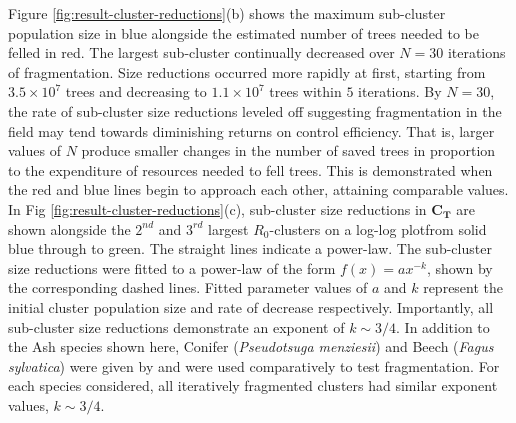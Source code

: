 Figure \ref{fig:result-cluster-reductions}(b) shows the maximum sub-cluster population size in blue alongside the estimated number of trees needed to be felled in red. The largest sub-cluster continually decreased over $N=30$ iterations of fragmentation. Size reductions occurred more rapidly at first, starting from $\mathrm{3.5\times 10^7}$ trees and decreasing to $\mathrm{1.1\times 10^7}$ trees within $5$ iterations. By $N=30$, the rate of sub-cluster size reductions leveled off suggesting fragmentation in the field may tend towards diminishing returns on control efficiency. That is, larger values of $N$ produce smaller changes in the number of saved trees in proportion to the expenditure of resources needed to fell trees. This is demonstrated when the red and blue lines begin to approach each other, attaining comparable values.\\ 

In Fig \ref{fig:result-cluster-reductions}(c), sub-cluster size reductions in $\mathbf{C_T}$ are shown alongside the $2^{nd}$ and $3^{rd}$ largest $R_0$-clusters on a log-log plot\textemdash from solid blue through to green. The straight lines indicate a power-law. The sub-cluster size reductions were fitted to a power-law of the form $f(x) = ax^{-k}$, shown by the corresponding dashed lines. Fitted parameter values of $a$ and $k$ represent the initial cluster population size and rate of decrease respectively. Importantly, all sub-cluster size reductions demonstrate an exponent of $k\sim 3/4$. In addition to the Ash species shown here, Conifer (\textit{Pseudotsuga menziesii}) and Beech (\textit{Fagus sylvatica}) were given by \cite{hill.data} and were used comparatively to test fragmentation. For each species considered, all iteratively fragmented clusters had similar exponent values, $k\sim 3/4$.\\


